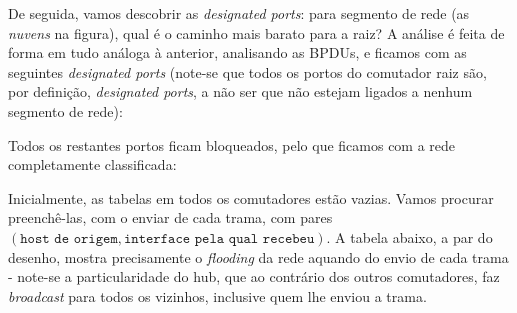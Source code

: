\begin{enumerate}[leftmargin=\labelsep]
        De seguida, vamos descobrir as \textit{designated ports}: para segmento de
        rede (as \textit{nuvens} na figura), qual é o caminho mais barato para a raiz?
        A análise é feita de forma em tudo análoga à anterior, analisando as BPDUs,
        e ficamos com as seguintes \textit{designated ports} (note-se que todos os portos
        do comutador raiz são, por definição, \textit{designated ports}, a não ser
        que não estejam ligados a nenhum segmento de rede):

        \begin{figure}[H]
          \centering
          
        \end{figure}

        Todos os restantes portos ficam bloqueados, pelo que ficamos com a rede
        completamente classificada:

        \begin{figure}[H]
          \centering
          
        \end{figure}


        Inicialmente, as tabelas em todos os comutadores estão vazias. Vamos procurar preenchê-las,
        com o enviar de cada trama, com pares $(\texttt{host de origem}, \texttt{interface pela qual recebeu})$.
        A tabela abaixo, a par do desenho, mostra precisamente o \textit{flooding} da rede
        aquando do envio de cada trama - note-se a particularidade do hub, que ao
        contrário dos outros comutadores, faz \textit{broadcast} para todos os
        vizinhos, inclusive quem lhe enviou a trama.


\end{enumerate}
